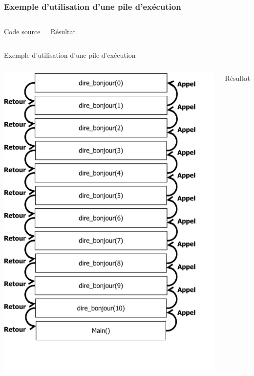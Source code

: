 \begin{frame}
\frametitle{Exemple d'utilisation d'une pile d'exécution}
\begin{columns}
\begin{block}{Code source}
\tiny{}
\end{block}
\begin{exampleblock}{Résultat}
\tiny{}
\end{exampleblock}
\end{columns}
\end{frame}

\begin{frame}{Exemple d'utilisation d'une pile d'exécution}
\begin{columns}
\includegraphics[height=\textheight]{../illustration/PileAppel.pdf}
\begin{exampleblock}{Résultat}
\tiny{}
\end{exampleblock}
\end{columns}
\end{frame}





